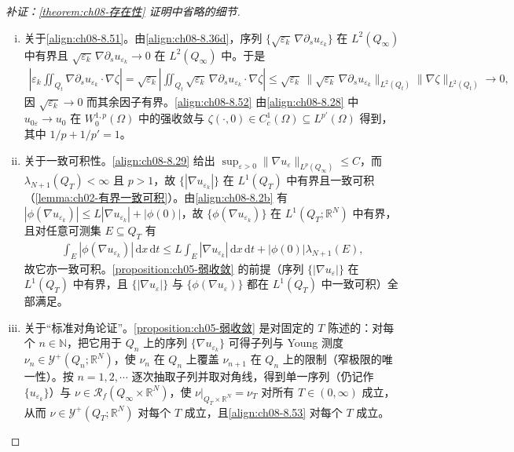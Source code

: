 \documentclass[../../main.tex]{subfiles}%
\begin{document}
\begin{proof}[补证：\cref{theorem:ch08-存在性} 证明中省略的细节]
\begin{enumerate}[(i)]
\item 关于\eqref{align:ch08-8.51}。由\eqref{align:ch08-8.36d}，序列 $\{\sqrt{\varepsilon_k}\,\nabla\partial_su_{\varepsilon_k}\}$ 在 $L^2(Q_\infty)$ 中有界且 $\sqrt{\varepsilon_k}\,\nabla\partial_su_{\varepsilon_k}\to0$ 在 $L^2(Q_\infty)$ 中。于是
\begin{align*}
\left|\varepsilon_k\iint_{Q_t}\nabla\partial_su_{\varepsilon_k}\cdot\nabla\zeta\right|
=\sqrt{\varepsilon_k}\left|\iint_{Q_t}\sqrt{\varepsilon_k}\,\nabla\partial_su_{\varepsilon_k}\cdot\nabla\zeta\right|
\leqslant\sqrt{\varepsilon_k}\,\|\sqrt{\varepsilon_k}\,\nabla\partial_su_{\varepsilon_k}\|_{L^2(Q_t)}\|\nabla\zeta\|_{L^2(Q_t)}\to0,
\end{align*}
因 $\sqrt{\varepsilon_k}\to0$ 而其余因子有界。\eqref{align:ch08-8.52} 由\eqref{align:ch08-8.28} 中 $u_{0\varepsilon}\to u_0$ 在 $W^{1,p}_0(\Omega)$ 中的强收敛与 $\zeta(\cdot,0)\in C^1_c(\Omega)\subseteq L^{p'}(\Omega)$ 得到，其中 $1/p+1/p'=1$。
\item 关于一致可积性。\eqref{align:ch08-8.29} 给出 $\sup_{\varepsilon>0}\|\nabla u_\varepsilon\|_{L^p(Q_\infty)}\leqslant C$，而 $\lambda_{N+1}(Q_T)<\infty$ 且 $p>1$，故 $\{|\nabla u_{\varepsilon_k}|\}$ 在 $L^1(Q_T)$ 中有界且一致可积（\cref{lemma:ch02-有界一致可积}）。由\eqref{align:ch08-8.2b} 有 $|\phi(\nabla u_{\varepsilon_k})|\leqslant L|\nabla u_{\varepsilon_k}|+|\phi(0)|$，故 $\{\phi(\nabla u_{\varepsilon_k})\}$ 在 $L^1(Q_T;\mathbb{R}^N)$ 中有界，且对任意可测集 $E\subseteq Q_T$ 有
\begin{align*}
\int_E|\phi(\nabla u_{\varepsilon_k})|\,\mathrm{d}x\,\mathrm{d}t\leqslant L\int_E|\nabla u_{\varepsilon_k}|\,\mathrm{d}x\,\mathrm{d}t+|\phi(0)|\lambda_{N+1}(E),
\end{align*}
故它亦一致可积。\cref{proposition:ch05-弱收敛} 的前提（序列 $\{|\nabla u_\varepsilon|\}$ 在 $L^1(Q_T)$ 中有界，且 $\{|\nabla u_\varepsilon|\}$ 与 $\{\phi(\nabla u_\varepsilon)\}$ 都在 $L^1(Q_T)$ 中一致可积）全部满足。
\item 关于“标准对角论证”。\cref{proposition:ch05-弱收敛} 是对固定的 $T$ 陈述的：对每个 $n\in\mathbb{N}$，把它用于 $Q_n$ 上的序列 $\{\nabla u_{\varepsilon_k}\}$ 可得子列与 Young 测度 $\nu_n\in\mathcal{Y}^+(Q_n;\mathbb{R}^N)$，使 $\nu_n$ 在 $Q_n$ 上覆盖 $\nu_{n+1}$ 在 $Q_n$ 上的限制（窄极限的唯一性）。按 $n=1,2,\cdots$ 逐次抽取子列并取对角线，得到单一序列（仍记作 $\{u_{\varepsilon_k}\}$）与 $\nu\in\mathscr{R}_f(Q_\infty\times\mathbb{R}^N)$，使 $\nu|_{Q_T\times\mathbb{R}^N}=\nu_T$ 对所有 $T\in(0,\infty)$ 成立，从而 $\nu\in\mathcal{Y}^+(Q_T;\mathbb{R}^N)$ 对每个 $T$ 成立，且\eqref{align:ch08-8.53} 对每个 $T$ 成立。

\end{enumerate}
\end{proof}
\end{document}
